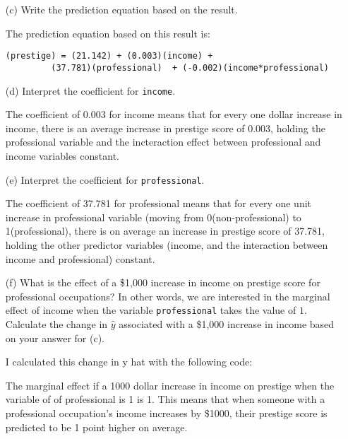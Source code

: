 \documentclass[12pt,letterpaper]{article}
\begin{document}
\begin{enumerate}
	\vspace{2cm}
	
	\item [(c)]
	Write the prediction equation based on the result.
	
	The prediction equation based on this result is:
\begin{verbatim}
(prestige) = (21.142) + (0.003)(income) +
         (37.781)(professional)  + (-0.002)(income*professional)
\end{verbatim}
	

	\item [(d)]
	Interpret the coefficient for \texttt{income}.
	
	The coefficient of 0.003 for income means that for every one dollar increase in 
	income, there is an average increase in prestige score of 0.003, holding the professional variable and the incteraction effect between professional and income variables constant.
	
	\vspace{1cm}	
	
	\item [(e)]
	Interpret the coefficient for \texttt{professional}.
	
	The coefficient of 37.781 for professional means that for every one unit increase
	in professional variable (moving from 0(non-professional) to 1(professional), there is on average an increase in prestige score of 37.781, holding the other predictor variables (income, and the interaction between income and professional) constant.
	
	\item [(f)]
	What is the effect of a \$1,000 increase in income on prestige score for professional occupations? In other words, we are interested in the marginal effect of income when the variable \texttt{professional} takes the value of $1$. Calculate the change in $\hat{y}$ associated with a \$1,000 increase in income based on your answer for (c).
	
	I calculated this change in y hat with the following code:
	
	
	
	The marginal effect if a 1000 dollar increase in income on prestige when the variable of 
	of professional is 1 is 1. This means that when someone with a professional occupation's income increases by \$1000, their prestige score is predicted to be 1 point higher on average.
	
	\vspace{1cm}
	

\end{enumerate}
\end{document}
